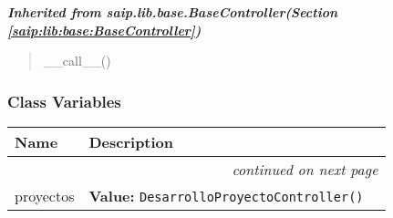 \large{\textbf{\textit{Inherited from saip.lib.base.BaseController\textit{(Section \ref{saip:lib:base:BaseController})}}}}

\begin{quote}
\_\_call\_\_()
\end{quote}


  \subsubsection{Class Variables}

    \vspace{-1cm}
\hspace{\varindent}\begin{longtable}{|p{\varnamewidth}|p{\vardescrwidth}|l}
\cline{1-2}
\cline{1-2} \centering \textbf{Name} & \centering \textbf{Description}& \\
\cline{1-2}
\endhead\cline{1-2}\multicolumn{3}{r}{\small\textit{continued on next page}}\\\endfoot\cline{1-2}
\endlastfoot\raggedright p\-r\-o\-y\-e\-c\-t\-o\-s\- & \raggedright \textbf{Value:} 
{\tt DesarrolloProyectoController()}&\\
\cline{1-2}
\end{longtable}

